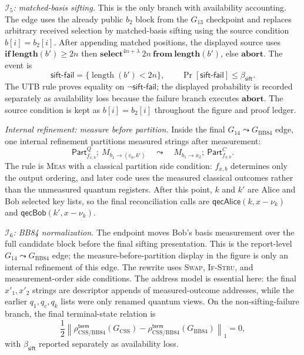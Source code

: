 \documentclass[conference,compsoc]{IEEEtran}
\newcommand{\bb}{\textsf{BB84}\xspace}
\begin{document}
\emph{\(\mathcal I_5\): matched-basis sifting.}
This is the only branch with availability accounting. The edge uses the
already public \(b_2\) block from the \(G_{13}\) checkpoint and replaces
arbitrary received selection by matched-basis sifting using the source
condition \(b[i]=b_2[i]\). After appending matched positions, the displayed
source uses \(\mathbf{if}\ \mathbf{length}(b')\ge2n\) then
\(\mathbf{select}^{4n+\lambda}\ 2n\ \mathbf{from}\ \mathbf{length}(b')\),
else \(\mathbf{abort}\). The event is
\[
\mathsf{sift\mbox{-}fail}
  =\{\operatorname{length}(b')<2n\},
\qquad
\Pr[\mathsf{sift\mbox{-}fail}]
\le
\beta_{\mathsf{sift}} .
\]
The \textsc{UTB} rule proves equality on \(\neg\mathsf{sift\mbox{-}fail}\);
the displayed probability is recorded separately as availability loss because
the failure branch executes \(\mathbf{abort}\). The source condition is kept as
\(b[i]=b_2[i]\) throughout the figure and proof ledger.

\emph{Internal refinement: measure before partition.}
Inside the final \(G_{14}\leadsto G_{\mathrm{BB84}}\) edge, one internal
refinement partitions measured strings after measurement:
\[
\mathsf{Part}^{Q}_{f_{x,b}};\ M_{b_1\to(c_b,k')}
\quad\leadsto\quad
M_{b_1\to x_2};\ \mathsf{Part}^{C}_{f_{x,b}} .
\]
The rule is \textsc{Meas} with a classical partition side condition: \(f_{x,b}\) determines only the output ordering, and later code uses the measured classical outcomes rather than the unmeasured quantum registers. After this point, \(k\) and \(k'\) are Alice and Bob selected key lists, so the final reconciliation calls are \(\mathsf{qecAlice}(k,x-\nu_k)\) and \(\mathsf{qecBob}(k',x-\nu_k)\).

\emph{\(\mathcal I_6\): \bb normalization.}
The endpoint moves Bob's basis measurement over the full candidate block before the final sifting presentation. This is the report-level \(G_{14}\leadsto G_{\mathrm{BB84}}\) edge; the measure-before-partition display in the figure is only an internal refinement of this edge. The rewrite uses \textsc{Swap}, \textsc{If-Stru}, and measurement-order side conditions. The address model is essential here: the final \(x'_1,x'_2\) strings are descriptor appends of measured-outcome addresses, while the earlier \(q_1,q_c,q_k\) lists were only renamed quantum views. On the non-sifting-failure branch, the final terminal-state relation is
\[
\frac12\left\|
  \rho^{\mathsf{term}}_{\mathrm{CSS/BB84}}(G_{\mathrm{CSS}})
  -
  \rho^{\mathsf{term}}_{\mathrm{CSS/BB84}}(G_{\mathrm{BB84}})
\right\|_1
=0,
\]
with \(\beta_{\mathsf{sift}}\) reported separately as availability loss.
\end{document}
